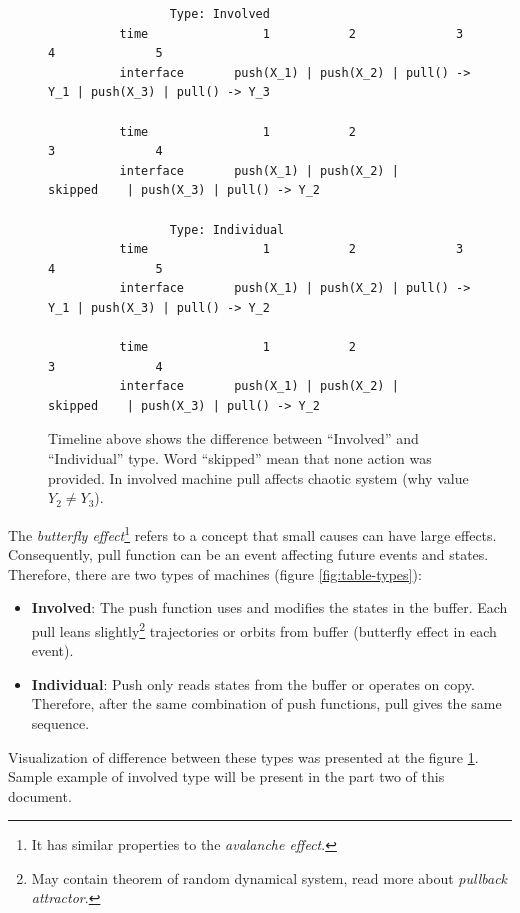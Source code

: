 \documentclass[twocolumn, a4paper, 10pt]{article}
\begin{document}
\begin{figure}[ht]
\begin{verbatim}
                 Type: Involved
          time                1           2              3            4              5
          interface       push(X_1) | push(X_2) | pull() -> Y_1 | push(X_3) | pull() -> Y_3

          time                1           2                           3              4
          interface       push(X_1) | push(X_2) |    skipped    | push(X_3) | pull() -> Y_2

                 Type: Individual
          time                1           2              3            4              5
          interface       push(X_1) | push(X_2) | pull() -> Y_1 | push(X_3) | pull() -> Y_2

          time                1           2                           3              4
          interface       push(X_1) | push(X_2) |    skipped    | push(X_3) | pull() -> Y_2
\end{verbatim}
  \caption{Timeline above shows the difference between ``Involved'' and ``Individual'' type. Word ``skipped'' mean that none action was provided. In involved machine pull affects chaotic system (why value $Y_2 \neq Y_3$).}
  \label{fig:machine-types}
\end{figure}

The \textit{butterfly effect}\footnote{It has similar properties to the \textit{avalanche effect}.} refers to a concept that small causes can have large effects. Consequently, pull function can be an event affecting future events and states. Therefore, there are two types of machines (figure \ref{fig:table-types}):

\begin{itemize}

\item\textbf{Involved}: The push function uses and modifies the states in the buffer. Each pull leans slightly\footnote{May contain theorem of random dynamical system, read more about \textit{pullback attractor}.} trajectories or orbits from buffer (butterfly effect in each event).

\item\textbf{Individual}: Push only reads states from the buffer or operates on copy. Therefore, after the same combination of push functions, pull gives the same sequence.

\end{itemize}

Visualization of difference between these types was presented at the figure \ref{fig:machine-types}. Sample example of involved type will be present in the part two of this document.
\end{document}
